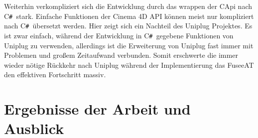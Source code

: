\documentclass[pagesize, paper=a4, fontsize=12pt, titlepage=true, headings=small, headnosepline, abstractoff, liststotoc, nochapterprefix, plainheadsepline, twoside]{scrreprt}
\newcommand{\CSS}{C\texttt{\# }}
\newcommand{\CPP}{C\nolinebreak\hspace{-.05em}\raisebox{.4ex}{\tiny\bf +}\nolinebreak\hspace{-.10em}\raisebox{.4ex}{\tiny\bf +}}
\begin{document}
Weiterhin verkompliziert sich die Entwicklung durch das wrappen der \CPP Api nach \CSS stark. Einfache Funktionen der Cinema 4D API können meist nur kompliziert nach \CSS übersetzt werden. Hier zeigt sich ein Nachteil des Uniplug Projektes. Es ist zwar einfach, während der Entwicklung in \CSS gegebene Funktionen von Uniplug zu verwenden, allerdings ist die Erweiterung von Uniplug fast immer mit Problemen und großem Zeitaufwand verbunden. Somit erschwerte die immer wieder nötige Rückkehr nach Uniplug während der Implementierung das FuseeAT den effektiven Fortschritt massiv.






\chapter{Ergebnisse der Arbeit und Ausblick}
\end{document}
